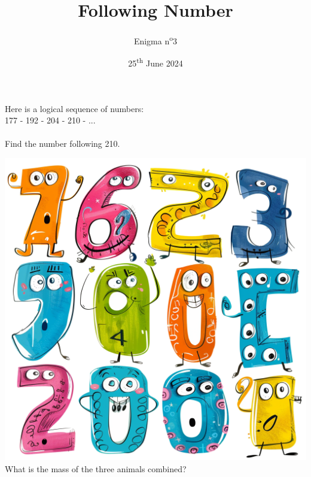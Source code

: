 \documentclass[a4paper, top=10mm]{article}
\title{\textbf{\huge{Following Number}}}
\author{Enigma n\textsuperscript{o}3}
\date{25\textsuperscript{th} June 2024}
\begin{document}
	\maketitle
	
	\Large
	Here is a logical sequence of numbers:\\
	177 - 192 - 204 - 210 - ...\\
	\\
	Find the number following 210.
	
	\begin{center}
		\includegraphics[width=\linewidth]{03image.png}\\
		What is the mass of the three animals combined?
	\end{center}
	
	
\end{document}
